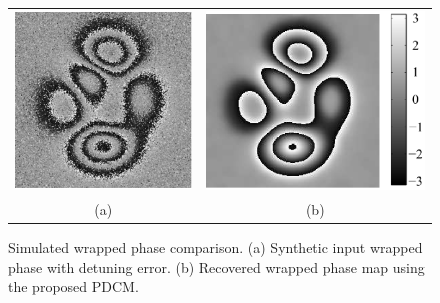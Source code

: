 \begin{figure}[th!]
  \begin{center}
    \begin{tabular}{ c c }
      \includegraphics[scale=0.75]{Chpt4_figures/Fig_1aNoise.eps}&
      \includegraphics[scale=0.75]{Chpt4_figures/Fig_1bNoise.eps}\\
      (a) &  (b)
    \end{tabular}
  \end{center}
  \caption{Simulated wrapped phase comparison. (a) Synthetic input wrapped 
  phase with detuning error. (b) Recovered wrapped phase map using the proposed 
  PDCM.}
  \label{fig:SimulatedPhaseComparison}
\end{figure}

